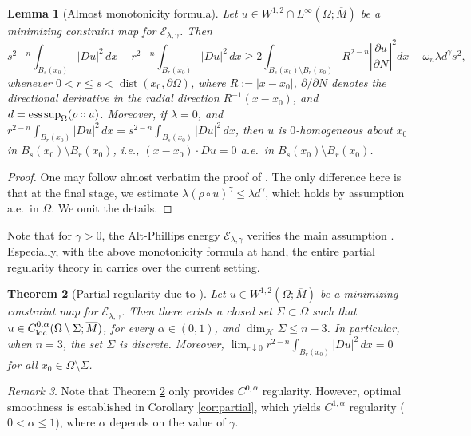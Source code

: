 \documentclass[11pt]{amsart}
\newcommand{\cE}{{\mathcal E}}
\newcommand{\cH}{{\mathcal H}}
\def\loc{{\textup{loc}}}
\def\loc{{\textup{loc}}}
\newcommand{\dist}{\operatorname{dist}}
\newcommand{\esssup}{\operatornamewithlimits{ess\,sup}}
\theoremstyle{plain}
\newtheorem{thm}{Theorem}[section]
\newtheorem{lem}[thm]{Lemma}
\theoremstyle{definition}
\theoremstyle{remark}
\newtheorem{rem}[thm]{Remark}
\numberwithin{equation}{section}
\begin{document}
\begin{lem}[Almost monotonicity formula]
    \label{lem:monot}
Let $u\in W^{1,2}\cap L^\infty(\Omega;\overline M)$ be a minimizing constraint map for $\cE_{\lambda,\gamma}$. Then 
$$
s^{2-n} \int_{B_s(x_0)} |Du|^2\,dx - r^{2-n}\int_{B_r(x_0)} |Du|^2\,dx \geq 2\int_{B_s(x_0)\setminus B_r(x_0)} R^{2-n}\left| \frac{\partial u}{\partial N}\right|^2 dx - \omega_n {\lambda} d^\gamma s^2,
$$
whenever $0 < r \leq s < \dist(x_0,\partial\Omega)$, where $R := |x-x_0|$, $\partial/\partial N$ denotes the directional derivative in the radial direction $R^{-1}(x-x_0)$, and $d = \esssup_\Omega(\rho\circ u)$. Moreover, if $\lambda = 0$, and $r^{2-n}\int_{B_r(x_0)} |Du|^2\,dx = s^{2-n}\int_{B_s(x_0)} |Du|^2\,dx$, then $u$ is $0$-homogeneous about $x_0$ in $B_s(x_0)\setminus B_r(x_0)$, i.e., $(x-x_0) \cdot Du = 0$ a.e.\ in $B_s(x_0)\setminus B_r(x_0)$. 
\end{lem}

\begin{proof}
    One may follow almost verbatim the proof of \cite[Lemma 2.2]{FGKS1}. The only difference here is that at the final stage, we estimate $\lambda(\rho\circ u)^\gamma \leq \lambda d^\gamma$, which holds by assumption a.e.\ in $\Omega$. We omit the details. 
\end{proof}

Note that for $\gamma > 0$, the Alt-Phillips energy $\cE_{\lambda,\gamma}$ verifies the main assumption \cite[(A1)]{L}. Especially, with the above monotonicity formula at hand, the entire partial regularity theory in \cite{L} carries over the current setting. 

\begin{thm}[Partial regularity due to \cite{L}]
    \label{thm:e-reg-Ca}
    Let $u\in W^{1,2}(\Omega;\overline M)$ be a minimizing constraint map for $\cE_{\lambda,\gamma}$. Then there exists a closed set $\Sigma\subset\Omega$ such that $u\in C_\loc^{0,\alpha}(\Omega\setminus\Sigma;\overline M)$, for every $\alpha \in (0,1)$, and $\dim_\cH\Sigma \leq n-3$. In particular, when $n = 3$, the set $\Sigma$ is discrete. Moreover, $\lim_{r\downarrow 0} r^{2-n}\int_{B_r(x_0)} |Du|^2\,dx = 0$ for all $x_0\in \Omega\setminus\Sigma$.
\end{thm}



\begin{rem}
  Note that Theorem \ref{thm:e-reg-Ca} only provides $C^{0,\alpha}$ regularity. 
However, optimal smoothness is established in Corollary \ref{cor:partial}, 
which yields $C^{1,\alpha}$ regularity ($0 < \alpha \leq 1$), where $\alpha$ depends on the value of $\gamma$.
\end{rem}
\end{document}
